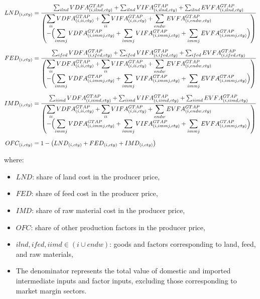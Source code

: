 \begin{align}
LND_{(i,cty)}
&=
\frac{
  \sum_{ilnd} VDFA^{GTAP}_{(i,ilnd,cty)}
  + \sum_{ilnd} VIFA^{GTAP}_{(i,ilnd,cty)}
  + \sum_{ilnd} EVFA^{GTAP}_{(i,ilnd,cty)}
}{
  \left(
  \begin{array}{@{}l@{}}
    \displaystyle
    \sum_{ii} VDFA^{GTAP}_{(i,ii,cty)}
    + \sum_{ii} VIFA^{GTAP}_{(i,ii,cty)}
    + \sum_{endw} EVFA^{GTAP}_{(i,endw,cty)} \\[0.2em]
    \displaystyle
    - \Bigl(
        \sum_{immj} VDFA^{GTAP}_{(i,immj,cty)}
      + \sum_{immj} VIFA^{GTAP}_{(i,immj,cty)}
      + \sum_{immj} EVFA^{GTAP}_{(i,immj,cty)}
      \Bigr)
  \end{array}
  \right)
}
\\[0.6em]
FED_{(i,cty)}
&=
\frac{
  \sum_{ifed} VDFA^{GTAP}_{(i,ifed,cty)}
  + \sum_{ifed} VIFA^{GTAP}_{(i,ifed,cty)}
  + \sum_{ifed} EVFA^{GTAP}_{(i,ifed,cty)}
}{
  \left(
  \begin{array}{@{}l@{}}
    \displaystyle
    \sum_{ii} VDFA^{GTAP}_{(i,ii,cty)}
    + \sum_{ii} VIFA^{GTAP}_{(i,ii,cty)}
    + \sum_{endw} EVFA^{GTAP}_{(i,endw,cty)} \\[0.2em]
    \displaystyle
    - \Bigl(
        \sum_{immj} VDFA^{GTAP}_{(i,immj,cty)}
      + \sum_{immj} VIFA^{GTAP}_{(i,immj,cty)}
      + \sum_{immj} EVFA^{GTAP}_{(i,immj,cty)}
      \Bigr)
  \end{array}
  \right)
}
\\[0.6em]
IMD_{(i,cty)}
&=
\frac{
  \sum_{iimd} VDFA^{GTAP}_{(i,iimd,cty)}
  + \sum_{iimd} VIFA^{GTAP}_{(i,iimd,cty)}
  + \sum_{iimd} EVFA^{GTAP}_{(i,iimd,cty)}
}{
  \left(
  \begin{array}{@{}l@{}}
    \displaystyle
    \sum_{ii} VDFA^{GTAP}_{(i,ii,cty)}
    + \sum_{ii} VIFA^{GTAP}_{(i,ii,cty)}
    + \sum_{endw} EVFA^{GTAP}_{(i,endw,cty)} \\[0.2em]
    \displaystyle
    - \Bigl(
        \sum_{immj} VDFA^{GTAP}_{(i,immj,cty)}
      + \sum_{immj} VIFA^{GTAP}_{(i,immj,cty)}
      + \sum_{immj} EVFA^{GTAP}_{(i,immj,cty)}
      \Bigr)
  \end{array}
  \right)
}
\\[0.6em]
OFC_{(i,cty)}
&=
1 - \bigl(LND_{(i,cty)} + FED_{(i,cty)} + IMD_{(i,cty)}\bigr)
\end{align}


where:
\begin{itemize}
\item \( LND \): share of land cost in the producer price,  
\item \( FED \): share of feed cost in the producer price,  
\item \( IMD \): share of raw material cost in the producer price,  
\item \( OFC \): share of other production factors in the producer price,  
\item \( ilnd, ifed, iimd \in (i \cup endw) \): goods and factors corresponding to land, feed, and raw materials,  
\item The denominator represents the total value of domestic and imported intermediate inputs 
      and factor inputs, excluding those corresponding to market margin sectors.
\end{itemize}

